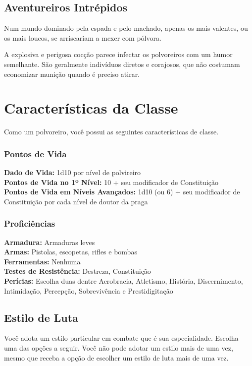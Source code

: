 \documentclass[letterpaper,twocolumn,openany]{dndbook}
\begin{document}
	\subsection{Aventureiros Intrépidos}
	Num mundo dominado pela espada e pelo machado, apenas os mais valentes, ou os mais loucos, se arriscariam a mexer com pólvora.
	
	A explosiva e perigosa cocção parece infectar os polvoreiros com um humor semelhante.	São geralmente indivíduos diretos e corajosos, que não costumam economizar munição quando é preciso atirar.
	
	\section{Características da Classe}
	Como um polvoreiro, você possui as seguintes características de classe.
	
	\subsubsection{Pontos de Vida}
	\noindent\textbf{Dado de Vida:} 1d10 por nível de polvireiro \\
	\noindent\textbf{Pontos de Vida no 1º Nível:} 10 + seu modificador de Constituição \\
	\noindent\textbf{Pontos de Vida em Níveis Avançados:} 1d10 (ou 6) + seu modificador de Constituição por cada nível de doutor da praga \\
	
	\subsubsection{Proficiências}
	\noindent\textbf{Armadura:} Armaduras leves \\
	\noindent\textbf{Armas:} Pistolas, escopetas, rifles e bombas \\
	\noindent\textbf{Ferramentas:} Nenhuma \\
	\noindent\textbf{Testes de Resistência:} Destreza, Constituição \\
	\noindent\textbf{Perícias:} Escolha duas dentre Acrobracia, Atletismo, História, Discernimento, Intimidação, Percepção, Sobrevivência e Prestidigitação\\
	
	\subsection{Estilo de Luta}
	Você adota um estilo particular em combate que é sua especialidade. Escolha uma das opções a seguir. Você não pode adotar um estilo mais de uma vez, mesmo que receba a opção de escolher um estilo de luta mais de uma vez.
	
\end{document}
